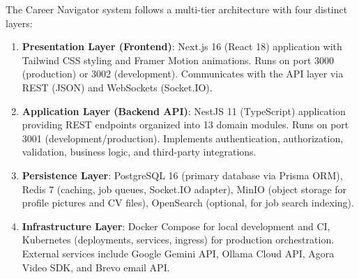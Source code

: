 \documentclass[12pt,a4paper]{report}
\begin{document}
The Career Navigator system follows a multi-tier architecture with four distinct layers:

\begin{enumerate}[label=\textbf{Tier \arabic*}:, leftmargin=*]
    \item \textbf{Presentation Layer (Frontend)}: Next.js 16 (React 18) application with Tailwind CSS styling and Framer Motion animations. Runs on port 3000 (production) or 3002 (development). Communicates with the API layer via REST (JSON) and WebSockets (Socket.IO).
    
    \item \textbf{Application Layer (Backend API)}: NestJS 11 (TypeScript) application providing REST endpoints organized into 13 domain modules. Runs on port 3001 (development/production). Implements authentication, authorization, validation, business logic, and third-party integrations.
    
    \item \textbf{Persistence Layer}: PostgreSQL 16 (primary database via Prisma ORM), Redis 7 (caching, job queues, Socket.IO adapter), MinIO (object storage for profile pictures and CV files), OpenSearch (optional, for job search indexing).
    
    \item \textbf{Infrastructure Layer}: Docker Compose for local development and CI, Kubernetes (deployments, services, ingress) for production orchestration. External services include Google Gemini API, Ollama Cloud API, Agora Video SDK, and Brevo email API.
\end{enumerate}
\end{document}
